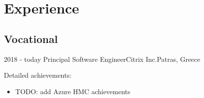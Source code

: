\documentclass[10pt,a4paper]{moderncv}        %
\begin{document}
\makecvtitle

\section{Experience}

\subsection{Vocational}

\cventry
{2018 - today}
{Principal Software Engineer}{Citrix Inc.}{Patras, Greece}{}
 {%
Detailed achievements:%
\begin{itemize}
  \item
TODO: add Azure HMC achievements
\end{itemize}}
\end{document}
